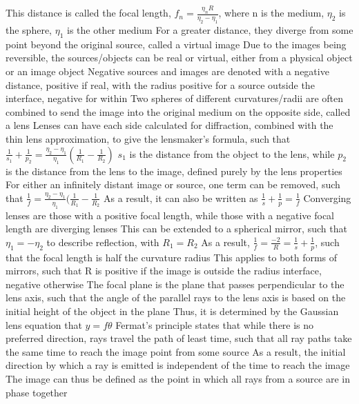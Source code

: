 \documentclass[11 pt, twoside]{article}
\newenvironment{outline*}
{
	\begin{outline}[enumerate]
	}
	{\end{outline}
}
\begin{document}
\begin{outline*}
\4 This distance is called the focal length, $f_n = \frac{\eta_{n}R}{\eta_2 - \eta_1}$, where n is the medium, $\eta_2$ is the sphere, $\eta_1$ is the other medium
\3 For a greater distance, they diverge from some point beyond the original source, called a virtual image
\3 Due to the images being reversible, the sources/objects can be real or virtual, either from a physical object or an image object
\3 Negative sources and images are denoted with a negative distance, positive if real, with the radius positive for a source outside the interface, negative for within
\1 Two spheres of different curvatures/radii are often combined to send the image into the original medium on the opposite side, called a lens
\2 Lenses can have each side calculated for diffraction, combined with the thin lens approximation, to give the lensmaker's formula, such that $\frac{1}{s_1} + \frac{1}{p_2} = \frac{\eta_2 - \eta_1}{\eta_1}(\frac{1}{R_1} - \frac{1}{R_2})$
\3 $s_1$ is the distance from the object to the lens, while $p_2$ is the distance from the lens to the image, defined purely by the lens properties
\3 For either an infinitely distant image or source, one term can be removed, such that $\frac{1}{f} = \frac{\eta_2 - \eta_1}{\eta_1}(\frac{1}{R_1} - \frac{1}{R_2}$
\3 As a result, it can also be written as $\frac{1}{s} + \frac{1}{p} = \frac{1}{f}$
\2 Converging lenses are those with a positive focal length, while those with a negative focal length are diverging lenses
\2 This can be extended to a spherical mirror, such that $\eta_1 = -\eta_2$ to describe reflection, with $R_1 = R_2$
\3 As a result, $\frac{1}{f} = \frac{-2}{R} = \frac{1}{s} + \frac{1}{p}$, such that the focal length is half the curvature radius
\3 This applies to both forms of mirrors, such that R is positive if the image is outside the radius interface, negative otherwise
\1 The focal plane is the plane that passes perpendicular to the lens axis, such that the angle of the parallel rays to the lens axis is based on the initial height of the object in the plane
\2 Thus, it is determined by the Gaussian lens equation that $y = f\theta$
\1 Fermat's principle states that while there is no preferred direction, rays travel the path of least time, such that all ray paths take the same time to reach the image point from some source
\2 As a result, the initial direction by which a ray is emitted is independent of the time to reach the image
\2 The image can thus be defined as the point in which all rays from a source are in phase together
\end{outline*}
\end{document}
